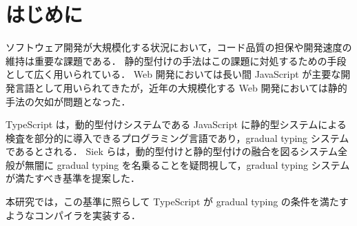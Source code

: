 \chapter{はじめに}

ソフトウェア開発が大規模化する状況において，コード品質の担保や開発速度の維持は重要な課題である．
静的型付けの手法はこの課題に対処するための手段として広く用いられている．
Web 開発においては長い間 JavaScript が主要な開発言語として用いられてきたが，近年の大規模化する Web 開発においては静的手法の欠如が問題となった．

TypeScript は，動的型付けシステムである JavaScript に静的型システムによる検査を部分的に導入できるプログラミング言語であり，gradual typing システムであるとされる．
Siek らは，動的型付けと静的型付けの融合を図るシステム全般が無闇に gradual typing を名乗ることを疑問視して，gradual typing システムが満たすべき基準を提案した．

本研究では，この基準に照らして TypeScript が gradual typing の条件を満たすようなコンパイラを実装する．

